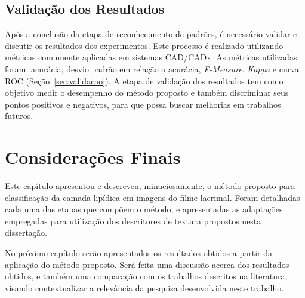 \subsection{Validação dos Resultados}
\label{sec:metodoValidacao}

Após a conclusão da etapa de reconhecimento de padrões, é necessário validar e discutir os resultados dos experimentos. Este processo é realizado utilizando métricas comumente aplicadas em sistemas CAD/CADx. As métricas utilizadas foram: acurácia, desvio padrão em relação a acurácia, \textit{F-Measure}, \textit{Kappa} e curva ROC (Seção~\ref{sec:validacao}). A etapa de validação dos resultados tem como objetivo medir o desempenho do método proposto e também discriminar seus pontos positivos e negativos, para que possa buscar melhorias em trabalhos futuros.

\section{Considerações Finais}
\label{sec:metodoConsideracoesF}

Este capítulo apresentou e descreveu, minuciosamente, o método proposto para classificação da camada lipídica em imagens do filme lacrimal. Foram detalhadas cada uma das etapas que compõem o método, e apresentadas as adaptações empregadas para utilização dos descritores de textura propostos nesta dissertação.

No próximo capítulo serão apresentados os resultados obtidos a partir da aplicação do método proposto. Será feita uma discussão acerca dos resultados obtidos, e também uma comparação com os trabalhos descritos na literatura, visando contextualizar a relevância da pesquisa desenvolvida neste trabalho.